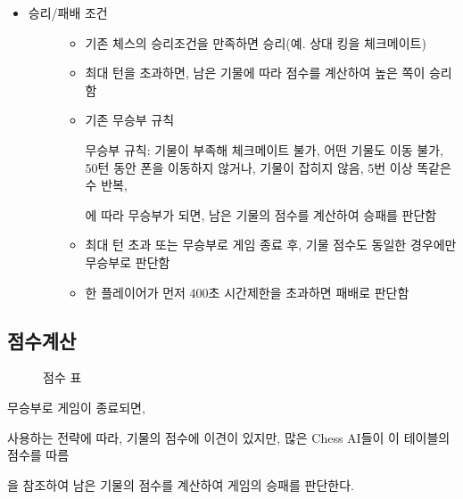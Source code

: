 \documentclass[letterpaper,10pt,english]{sphinxmanual}
\begin{document}
\begin{itemize}
\item {} \begin{description}
\item[{승리/패배 조건}] \leavevmode\begin{itemize}
\item {} 
기존 체스의 승리조건을 만족하면 승리(예. 상대 킹을 체크메이트)

\item {} 
최대 턴을 초과하면, 남은 기물에 따라 점수를 계산하여 높은 쪽이 승리함

\item {} 
기존 무승부 규칙 %
\begin{footnote}[2]\sphinxAtStartFootnote
무승부 규칙: 기물이 부족해 체크메이트 불가, 어떤 기물도 이동 불가, 50턴 동안 폰을 이동하지 않거나, 기물이 잡히지 않음, 5번 이상 똑같은 수 반복, 
%
\end{footnote} 에 따라 무승부가 되면, 남은 기물의 점수를 계산하여 승패를 판단함

\item {} 
최대 턴 초과 또는 무승부로 게임 종료 후, 기물 점수도 동일한 경우에만 무승부로 판단함

\item {} 
한 플레이어가 먼저 400초 시간제한을 초과하면 패배로 판단함

\end{itemize}

\end{description}

\end{itemize}


\subsection{점수계산}
\label{\detokenize{01-microchess_ai_competition:id4}}
\begin{figure}[htbp]
\centering
\capstart

\noindent{}
\caption{점수 표}\label{\detokenize{01-microchess_ai_competition:score-table}}\label{\detokenize{01-microchess_ai_competition:id15}}\end{figure}

무승부로 게임이 종료되면, {\hyperref[\detokenize{01-microchess_ai_competition:score-table}]{}} %
\begin{footnote}[3]\sphinxAtStartFootnote
사용하는 전략에 따라, 기물의 점수에 이견이 있지만, 많은 Chess AI들이 이 테이블의 점수를 따름
%
\end{footnote} 을 참조하여 남은 기물의 점수를 계산하여 게임의 승패를 판단한다.
\end{document}

